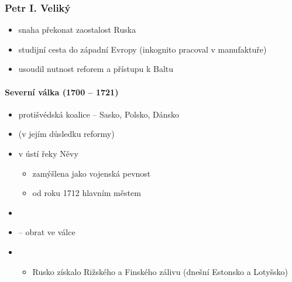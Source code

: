 \subsubsection{Petr I. Veliký}
\begin{itemize}
\item snaha překonat zaostalost Ruska
\item studijní cesta do západní Evropy (inkognito pracoval v manufaktuře)
\item usoudil nutnost reforem a přístupu k Baltu
\end{itemize}

\paragraph{Severní válka (1700 -- 1721)}
\begin{itemize}
\item protišvédská koalice -- Sasko, Polsko, Dánsko
\item {} (v jejím důsledku reformy)
\item {} v ústí řeky Něvy
	\begin{itemize}
	\item zamýšlena jako vojenská pevnost
	\item od roku 1712 hlavním městem
	\end{itemize}
\item {}
\item {} -- obrat ve válce
\item {}
	\begin{itemize}
	\item Rusko získalo Rižského a Finského zálivu (dnešní Estonsko a Lotyšsko)
	\end{itemize}
\end{itemize}

